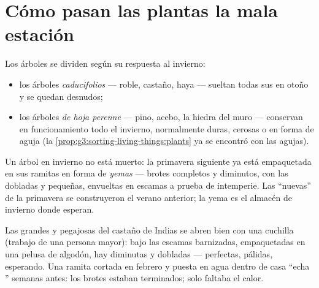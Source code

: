 \section{Cómo pasan las plantas la mala estación}

\begin{definition}\label{def:g6:life-through-seasons:trees}
Los árboles se dividen según su respuesta al invierno:
\begin{itemize}
  \item los árboles \emph{caducifolios} --- roble,
        castaño, haya --- sueltan todas sus  en otoño y se quedan
        desnudos;
  \item los árboles \emph{de hoja perenne} ---
        pino, acebo, la hiedra del muro --- conservan  en
        funcionamiento todo el invierno, normalmente duras, cerosas o
        en forma de aguja (la
        \cref{prop:g3:sorting-living-things:plants} ya se encontró con
        las agujas).
\end{itemize}
\end{definition}

\begin{definition}\label{def:g6:life-through-seasons:buds}
Un árbol  en invierno no está muerto: la primavera
siguiente ya está empaquetada en sus ramitas en forma de
\emph{yemas} --- brotes completos y diminutos, con las
 dobladas y pequeñas, envueltas en escamas a prueba de
intemperie. Las  ``nuevas'' de la primavera se construyeron el
verano anterior; la yema es el almacén de invierno donde esperan.
\end{definition}

\begin{example}\label{ex:g6:life-through-seasons:bud}
Las  grandes y pegajosas del castaño de Indias se abren bien con
una cuchilla (trabajo de una persona mayor): bajo las escamas
barnizadas, empaquetadas en una pelusa de algodón, hay 
diminutas y dobladas --- perfectas, pálidas, esperando. Una ramita
cortada en febrero y puesta en agua dentro de casa ``echa ''
semanas antes: los brotes estaban terminados; solo faltaba el calor.
\end{example}

